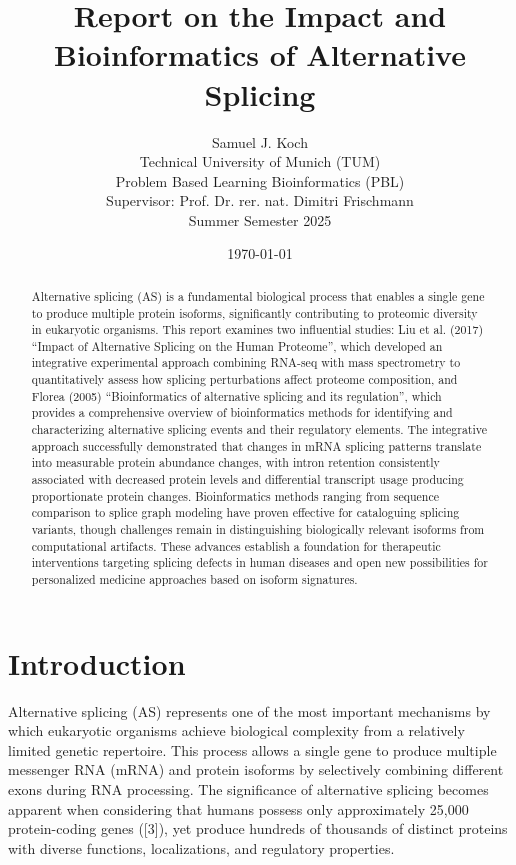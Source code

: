 \documentclass[12pt,a4paper]{article}
\title{Report on the Impact and Bioinformatics of Alternative Splicing}
\author{Samuel J. Koch \\
        Technical University of Munich (TUM) \\
        Problem Based Learning Bioinformatics (PBL) \\
        Supervisor: Prof. Dr. rer. nat. Dimitri Frischmann \\
        Summer Semester 2025}
\date{\today}
\begin{document}
\maketitle
\newpage

\tableofcontents
\newpage

\doublespacing

\begin{abstract}
Alternative splicing (AS) is a fundamental biological process that enables a single gene to produce multiple protein isoforms, significantly contributing to proteomic diversity in eukaryotic organisms. This report examines two influential studies: Liu et al. (2017) ``Impact of Alternative Splicing on the Human Proteome'', which developed an integrative experimental approach combining RNA-seq with mass spectrometry to quantitatively assess how splicing perturbations affect proteome composition, and Florea (2005) ``Bioinformatics of alternative splicing and its regulation'', which provides a comprehensive overview of bioinformatics methods for identifying and characterizing alternative splicing events and their regulatory elements. The integrative approach successfully demonstrated that changes in mRNA splicing patterns translate into measurable protein abundance changes, with intron retention consistently associated with decreased protein levels and differential transcript usage producing proportionate protein changes. Bioinformatics methods ranging from sequence comparison to splice graph modeling have proven effective for cataloguing splicing variants, though challenges remain in distinguishing biologically relevant isoforms from computational artifacts. These advances establish a foundation for therapeutic interventions targeting splicing defects in human diseases and open new possibilities for personalized medicine approaches based on isoform signatures.
\end{abstract}

\newpage

\section{Introduction}

Alternative splicing (AS) represents one of the most important mechanisms by which eukaryotic organisms achieve biological complexity from a relatively limited genetic repertoire. This process allows a single gene to produce multiple messenger RNA (mRNA) and protein isoforms by selectively combining different exons during RNA processing. The significance of alternative splicing becomes apparent when considering that humans possess only approximately 25,000 protein-coding genes ([3]), yet produce hundreds of thousands of distinct proteins with diverse functions, localizations, and regulatory properties.
\end{document}
